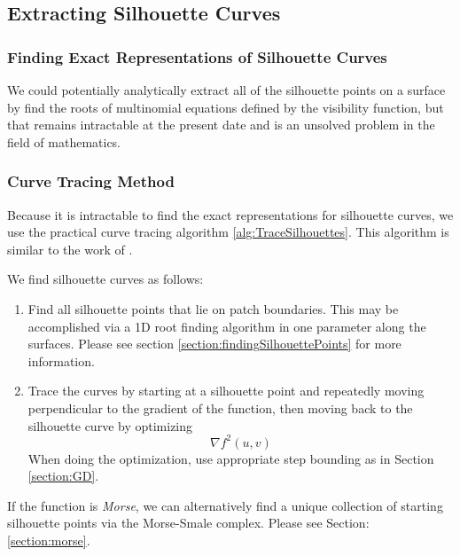 \documentclass[12pt, letterpaper]{article}
\begin{document}
	\subsection{Extracting Silhouette Curves}

		\subsubsection{Finding Exact Representations of Silhouette Curves}
			We could potentially analytically extract all of the silhouette points on a surface by find the roots of multinomial equations defined by the visibility function,
			but that remains intractable at the present date and is an unsolved problem in the field of mathematics.
	
		\subsubsection{Curve Tracing Method}

			Because it is intractable to find the exact representations for silhouette curves, we use the practical curve tracing algorithm \ref{alg:TraceSilhouettes}.
			This algorithm is similar to the work of \cite{XJY98}.

			We find silhouette curves as follows:

			\begin{enumerate}
			\item Find all silhouette points that lie on patch boundaries. This may be accomplished via a 1D root finding algorithm in one parameter along the surfaces.
				Please see section \ref{section:findingSilhouettePoints} for more information.
			\item Trace the curves by starting at a silhouette point and repeatedly moving perpendicular to the gradient of the function,
				 then moving back to the silhouette curve by optimizing $$\nabla f^{2}(u, v)$$ When doing the optimization, use appropriate step bounding as in Section \ref{section:GD}.
			\end{enumerate}

			If the function is \emph{Morse}, we can alternatively find a unique collection of starting silhouette points via the Morse-Smale complex. Please see Section:
			\ref{section:morse}.
\end{document}
